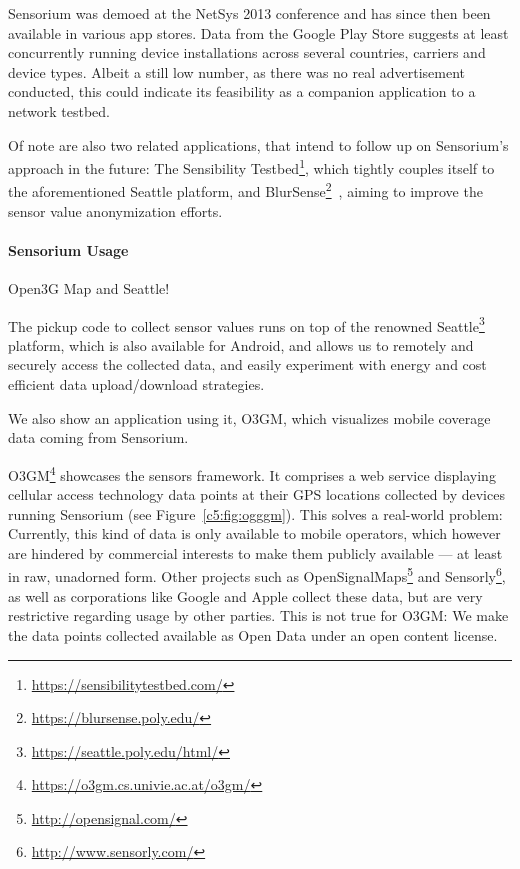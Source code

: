 Sensorium was demoed at the NetSys 2013 conference and has since then been available in various app stores. Data from the Google Play Store suggests at least  concurrently running device installations across several countries, carriers and device types. Albeit a still low number, as there was no real advertisement conducted, this could indicate its feasibility as a companion application to a network testbed.

Of note are also two related applications, that intend to follow up on Sensorium's approach in the future: The Sensibility Testbed\footnote{\url{https://sensibilitytestbed.com/}}, which tightly couples itself to the aforementioned Seattle platform, and BlurSense\footnote{\url{https://blursense.poly.edu/}}~\cite{6798970}, aiming to improve the sensor value anonymization efforts. 


\paragraph{Sensorium Usage}


Open3G Map and Seattle!

The pickup code to collect sensor values runs on top of the renowned Seattle\footnote{\url{https://seattle.poly.edu/html/}} platform, which is also available for Android, and allows us to remotely and securely access the collected data, and easily experiment with energy and cost efficient data upload/download strategies. 


We also show an application using it, \gls{O3GM}, which visualizes mobile coverage data coming from Sensorium.

\gls{O3GM}\footnote{\url{https://o3gm.cs.univie.ac.at/o3gm/}} showcases the sensors framework. It comprises a web service displaying cellular access technology data points at their \gls{GPS} locations collected by devices running Sensorium (see Figure~\ref{c5:fig:ogggm}). This solves a real-world problem: Currently, this kind of data is only available to mobile operators, which however  are hindered by commercial interests to make them publicly available --- at least in raw, unadorned form. Other projects such as OpenSignalMaps\footnote{\url{http://opensignal.com/}} and Sensorly\footnote{\url{http://www.sensorly.com/}}, as well as corporations like Google and Apple collect these data, but are very restrictive regarding usage by other parties. This is not true for \gls{O3GM}: We make the data points collected available as Open Data under an open content license.

